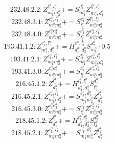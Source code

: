 \documentclass[letterpaper,10pt,fleqn,leqno,onecolumn]{article}
\begin{document}
\begin{equation} \;\;\;\;\;\;  232.48.2.2: Z^{l_{1}^{a},l_{2}^{a}}_{m_{1}^{a}m_{2}^{a}}+=S^{d_{1}^{a}}_{m_{1}^{a}}Z^{l_{1}^{a},l_{2}^{a}}_{m_{2}^{a},d_{1}^{a}} \end{equation}
\begin{equation} \;\;\;\;\;\;  232.48.3.1: Z^{e_{1}^{a},l_{1}^{a}}_{m_{1}^{a}m_{2}^{a}}+=S^{e_{1}^{a}}_{l_{2}^{a}}Z^{l_{1}^{a},l_{2}^{a}}_{m_{1}^{a}m_{2}^{a}} \end{equation}
\begin{equation} \;\;\;\;\;\;  232.48.4.0: Z^{e_{1}^{a}e_{2}^{a}}_{m_{1}^{a}m_{2}^{a}}+=S^{e_{1}^{a}}_{l_{1}^{a}}Z^{e_{2}^{a},l_{1}^{a}}_{m_{1}^{a}m_{2}^{a}} \end{equation}
\begin{equation} \;\;\;\;\;\;  193.41.1.2: Z^{e_{1}^{a},l_{1}^{a}}_{m_{1}^{a},d_{1}^{a}}+=H^{e_{1}^{a},l_{1}^{a}}_{d_{1}^{a},d_{2}^{a}}S^{d_{2}^{a}}_{m_{1}^{a}}\cdot 0.5 \end{equation}
\begin{equation} \;\;\;\;\;\;  193.41.2.1: Z^{e_{1}^{a},l_{1}^{a}}_{m_{1}^{a}m_{2}^{a}}+=S^{d_{1}^{a}}_{m_{1}^{a}}Z^{e_{1}^{a},l_{1}^{a}}_{m_{2}^{a},d_{1}^{a}} \end{equation}
\begin{equation} \;\;\;\;\;\;  193.41.3.0: Z^{e_{1}^{a}e_{2}^{a}}_{m_{1}^{a}m_{2}^{a}}+=S^{e_{1}^{a}}_{l_{1}^{a}}Z^{e_{2}^{a},l_{1}^{a}}_{m_{1}^{a}m_{2}^{a}} \end{equation}
\begin{equation} \;\;\;\;\;\;  216.45.1.2: Z^{l_{1}^{a}}_{d_{1}^{a}}+=H^{l_{1}^{b},l_{1}^{a}}_{d_{1}^{b},d_{1}^{a}}S^{d_{1}^{b}}_{l_{1}^{b}} \end{equation}
\begin{equation} \;\;\;\;\;\;  216.45.2.1: Z^{e_{1}^{a},l_{1}^{a}}_{m_{1}^{a}m_{2}^{a}}+=S^{e_{1}^{a},d_{1}^{a}}_{m_{1}^{a}m_{2}^{a}}Z^{l_{1}^{a}}_{d_{1}^{a}} \end{equation}
\begin{equation} \;\;\;\;\;\;  216.45.3.0: Z^{e_{1}^{a}e_{2}^{a}}_{m_{1}^{a}m_{2}^{a}}+=S^{e_{1}^{a}}_{l_{1}^{a}}Z^{e_{2}^{a},l_{1}^{a}}_{m_{1}^{a}m_{2}^{a}} \end{equation}
\begin{equation} \;\;\;\;\;\;  218.45.1.2: Z^{l_{1}^{a}}_{d_{1}^{a}}+=H^{l_{1}^{a},l_{2}^{a}}_{d_{1}^{a},d_{2}^{a}}S^{d_{2}^{a}}_{l_{2}^{a}} \end{equation}
\begin{equation} \;\;\;\;\;\;  218.45.2.1: Z^{e_{1}^{a},l_{1}^{a}}_{m_{1}^{a}m_{2}^{a}}+=S^{e_{1}^{a},d_{1}^{a}}_{m_{1}^{a}m_{2}^{a}}Z^{l_{1}^{a}}_{d_{1}^{a}} \end{equation}
\end{document}
